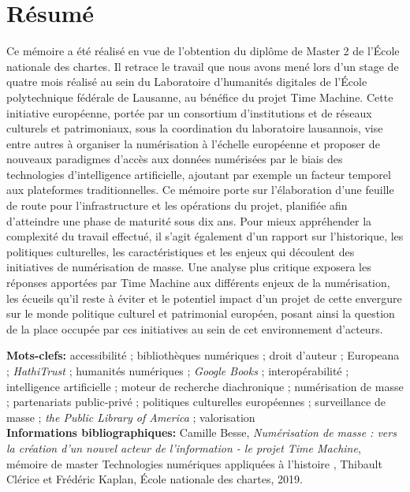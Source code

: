 \chapter*{Résumé}
Ce mémoire a été réalisé en vue de l'obtention du diplôme de Master 2  de l'École nationale des chartes. Il retrace le travail que nous avons mené lors d'un stage de quatre mois réalisé au sein du Laboratoire d'humanités digitales de l'École polytechnique fédérale de Lausanne, au bénéfice du projet Time Machine. Cette initiative européenne, portée par un consortium d'institutions et de réseaux culturels et patrimoniaux, sous la coordination du laboratoire lausannois, vise entre autres à organiser la numérisation à l'échelle européenne et proposer de nouveaux paradigmes d'accès aux données numérisées par le biais des technologies d'intelligence artificielle, ajoutant par exemple un facteur temporel aux plateformes traditionnelles. Ce mémoire porte sur l'élaboration d'une feuille de route pour l'infrastructure et les opérations du projet, planifiée afin d'atteindre une phase de maturité sous dix ans. Pour mieux appréhender la complexité du travail effectué, il s'agit également d'un rapport sur l'historique, les politiques culturelles, les caractéristiques et les enjeux qui découlent des initiatives de numérisation de masse. Une analyse plus critique exposera les réponses apportées par Time Machine aux différents enjeux de la numérisation, les écueils qu'il reste à éviter et le potentiel impact d'un projet de cette envergure sur le monde politique culturel et patrimonial européen, posant ainsi la question de la place occupée par ces initiatives au sein de cet environnement d'acteurs.

\medskip


\textbf{Mots-clefs:} accessibilité ; bibliothèques numériques ; droit d'auteur ;  Europeana ; \textit{HathiTrust} ; humanités numériques ; \textit{Google Books} ; interopérabilité ;  intelligence artificielle ;  moteur de recherche diachronique ; numérisation de masse ; partenariats public-privé ; politiques culturelles européennes ; surveillance de masse ; \textit{the Public Library of America} ; valorisation \\

\textbf{Informations bibliographiques:} Camille Besse, \textit{Numérisation de masse : vers la création d'un nouvel acteur de l'information - le projet Time Machine}, mémoire de master \og Technologies numériques appliquées à l'histoire \fg{}, Thibault Clérice et Frédéric Kaplan, École nationale des chartes, 2019.

\clearpage
\thispagestyle{empty}
\cleardoublepage